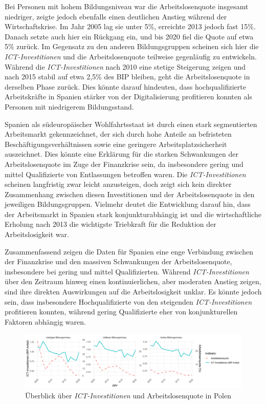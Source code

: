 Bei Personen mit hohem Bildungsniveau war die Arbeitslosenquote insgesamt niedriger, 
zeigte jedoch ebenfalls einen deutlichen Anstieg während der Wirtschaftskrise. Im Jahr 
2005 lag sie unter 5\%, erreichte 2013 jedoch fast 15\%. Danach setzte auch hier ein 
Rückgang ein, und bis 2020 fiel die Quote auf etwa 5\% zurück. Im Gegensatz zu den 
anderen Bildungsgruppen scheinen sich hier die \textit{\ac{ICT}-Investitionen} und 
die Arbeitslosenquote teilweise gegenläufig zu entwickeln. Während die 
\textit{\ac{ICT}-Investitionen} nach 2010 eine stetige Steigerung zeigen und nach 
2015 stabil auf etwa 2,5\% des BIP bleiben, geht die Arbeitslosenquote in derselben 
Phase zurück. Dies könnte darauf hindeuten, dass hochqualifizierte Arbeitskräfte in 
Spanien stärker von der Digitalisierung profitieren konnten als Personen mit 
niedrigerem Bildungsstand.

Spanien als südeuropäischer Wohlfahrtsstaat ist durch einen stark segmentierten 
Arbeitsmarkt gekennzeichnet, der sich durch hohe Anteile an befristeten 
Beschäftigungsverhältnissen sowie eine geringere Arbeitsplatzsicherheit auszeichnet. 
Dies könnte eine Erklärung für die starken Schwankungen der Arbeitslosenquote 
im Zuge der Finanzkrise sein, da insbesondere gering und mittel Qualifizierte 
von Entlassungen betroffen waren. Die \textit{\ac{ICT}-Investitionen} scheinen 
langfristig zwar leicht anzusteigen, doch zeigt sich kein direkter Zusammenhang 
zwischen diesen Investitionen und der Arbeitslosenquote in den jeweiligen 
Bildungsgruppen. Vielmehr deutet die Entwicklung darauf hin, dass der Arbeitsmarkt 
in Spanien stark konjunkturabhängig ist und die wirtschaftliche Erholung nach 2013 
die wichtigste Triebkraft für die Reduktion der Arbeitslosigkeit war. %

Zusammenfassend zeigen die Daten für Spanien eine enge Verbindung zwischen der 
Finanzkrise und den massiven Schwankungen der Arbeitslosenquote, insbesondere bei 
gering und mittel Qualifizierten. Während \textit{\ac{ICT}-Investitionen} über den 
Zeitraum hinweg einen kontinuierlichen, aber moderaten Anstieg zeigen, sind ihre 
direkten Auswirkungen auf die Arbeitslosigkeit unklar. Es könnte jedoch sein, dass 
insbesondere Hochqualifizierte von den steigenden \textit{\ac{ICT}-Investitionen} 
profitieren konnten, während gering Qualifizierte eher von konjunkturellen 
Faktoren abhängig waren.

\begin{figure}[htbp]
    \centering
    \includegraphics[width=\textwidth]{assets/plot_poland.png}
    \caption{Überblick über \textit{\ac{ICT}-Investitionen} und Arbeitslosenquote 
    in Polen}
    \label{fig:poland}
\end{figure}


